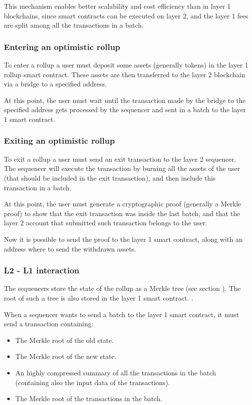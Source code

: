 \documentclass[12pt]{article}
\begin{document}
This mechanism enables better scalability and cost efficiency than in layer 1 blockchains, since smart contracts can be executed on layer 2, and the layer 1 fees are split among all the transactions in a batch.

\subsubsection{Entering an optimistic rollup} \label{subsubsection:entering_optimistic_rollup}
To enter a rollup a user must deposit some assets (generally tokens) in the layer 1 rollup smart contract. These assets are then transferred to the layer 2 blockchain via a bridge to a specified address.

At this point, the user must wait until the transaction made by the bridge to the specified address gets processed by the sequencer and sent in a batch to the layer 1 smart contract.

\subsubsection{Exiting an optimistic rollup} \label{subsubsection:exiting_optimistic_rollup}
To exit a rollup a user must send an exit transaction to the layer 2 sequencer. The sequencer will execute the transaction by burning all the assets of the user (that should be included in the exit transaction), and then include this transaction in a batch.

At this point, the user must generate a cryptographic proof (generally a Merkle proof) to show that the exit transaction was inside the last batch, and that the layer 2 account that submitted such transaction belongs to the user.

Now it is possible to send the proof to the layer 1 smart contract, along with an address where to send the withdrawn assets.

\subsubsection{L2 - L1 interaction} \label{subsubsection:l2l1i}
The sequencers store the state of the rollup as a Merkle tree (see section ). The root of such a tree is also stored in the layer 1 smart contract. \cite{optimistic_rollups}.

When a sequencer wants to send a batch to the layer 1 smart contract, it must send a transaction containing:
\begin{itemize}
    \item The Merkle root of the old state.
    \item The Merkle root of the new state.
    \item An highly compressed summary of all the transactions in the batch (containing also the input data of the transactions).
    \item The Merkle root of the transactions in the batch.
\end{itemize}
\end{document}
